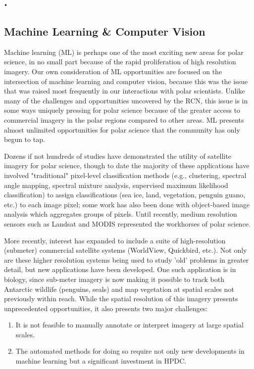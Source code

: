 \texttt{•}\documentclass[10pt,letterpaper,draft]{article}
\begin{document}
\subsection{Machine Learning \& Computer Vision}
Machine learning (ML) is perhaps one of the most exciting new areas for polar science, in no small part because of the rapid proliferation of high resolution imagery. Our own consideration of ML opportunities are focused on the intersection of machine learning and computer vision, because this was the issue that was raised most frequently in our interactions with polar scientists. Unlike many of the challenges and opportunities uncovered by the RCN, this issue is in some ways uniquely pressing for polar science because of the greater access to commercial imagery in the polar regions compared to other areas. ML presents almost unlimited opportunities for polar science that the community has only begun to tap. 

Dozens if not hundreds of studies have demonstrated the utility of satellite imagery for polar science, though to date the majority of these applications have involved "traditional" pixel-level classification methods (e.g., clustering, spectral angle mapping, spectral mixture analysis, supervised maximum likelihood classification) to assign classifications (sea ice, land, vegetation, penguin guano, etc.) to each image pixel; some work has also been done with object-based image analysis which aggregates groups of pixels. Until recently, medium resolution sensors such as Landsat and MODIS represented the workhorses of polar science.

More recently, interest has expanded to include a suite of high-resolution (submeter) commercial satellite systems (WorldView, Quickbird, etc.). Not only are these higher resolution systems being used to study 'old' problems in greater detail, but new applications have been developed. One such application is in biology, since sub-meter imagery is now making it possible to track both Antarctic wildlife (penguins, seals) and map vegetation at spatial scales not previously within reach. While the spatial resolution of this imagery presents unprecedented opportunities, it also presents two major challenges:
\begin{enumerate}
    \item It is not feasible to manually annotate or interpret imagery at large spatial scales.
    \item The automated methods for doing so require not only new developments in machine learning but a significant investment in HPDC.
\end{enumerate}
\end{document}
